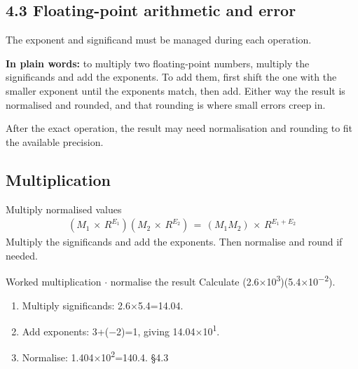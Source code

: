 \documentclass[11pt]{article}
\begin{document}
\begin{keepsection}
\section{4.3 Floating-point arithmetic and error}

The exponent and significand must be managed during each operation.

\begin{plainbox}\textbf{In plain words:} to multiply two floating-point numbers, multiply the significands and add the exponents. To add them, first shift the one with the smaller exponent until the exponents match, then add. Either way the result is normalised and rounded, and that rounding is where small errors creep in.\end{plainbox}

After the exact operation, the result may need normalisation and rounding to fit the available precision.

\begin{keepsection}
\subsection{Multiplication}

\begin{equationcard}{Multiply normalised values}
\[ \begin{gathered} ({M}_{1}\, \times \, {R}^{{E}_{1}})({M}_{2}\, \times \, {R}^{{E}_{2}})\, =\, ({M}_{1}{M}_{2})\, \times \, {R}^{{E}_{1}+{E}_{2}} \end{gathered} \]
{\small Multiply the significands and add the exponents. Then normalise and round if needed.}
\end{equationcard}

\begin{workedbox}{Worked multiplication \ensuremath{\cdot} normalise the result}
Calculate (2.6\ensuremath{\times}10\textsuperscript{3})(5.4\ensuremath{\times}10\textsuperscript{\ensuremath{-}2}).

\begin{enumerate}
\item Multiply significands: 2.6\ensuremath{\times}5.4=14.04.
\item Add exponents: 3+(\ensuremath{-}2)=1, giving 14.04\ensuremath{\times}10\textsuperscript{1}.
\item Normalise: 1.404\ensuremath{\times}10\textsuperscript{2}=140.4. \hfill{\small\color{FAUblue}§4.3}
\end{enumerate}
\end{workedbox}
\end{keepsection}


\end{keepsection}
\end{document}
